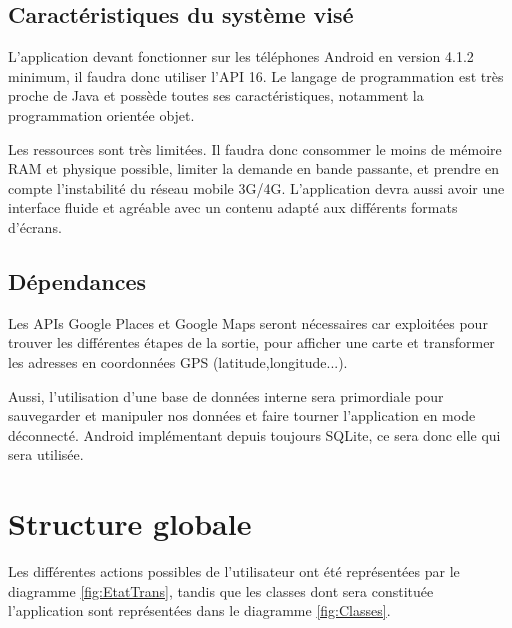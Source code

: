 \documentclass[a4paper, 12pt, notitlepage]{article} %
\begin{document}
\subsection{Caractéristiques du système visé}
L'application devant fonctionner sur les téléphones Android en version 4.1.2 minimum, il faudra donc utiliser l'API 16.
Le langage de programmation est très proche de Java et possède toutes ses caractéristiques, notamment la programmation orientée objet.

Les ressources sont très limitées. Il faudra donc consommer le moins de mémoire RAM et physique possible, limiter la demande en bande passante, et prendre en compte l'instabilité du réseau mobile 3G/4G.
L'application devra aussi avoir une interface fluide et agréable avec un contenu adapté aux différents formats d'écrans.

\subsection{Dépendances}
Les APIs Google Places et Google Maps seront nécessaires car exploitées pour trouver les différentes étapes de la sortie, pour afficher une carte et transformer les adresses en coordonnées GPS (latitude,longitude...).

Aussi, l'utilisation d'une base de données interne sera primordiale pour sauvegarder et manipuler nos données et faire tourner l'application en mode déconnecté. Android implémentant depuis toujours SQLite, ce sera donc elle qui sera utilisée.
\clearpage



\section{Structure globale}
Les différentes actions possibles de l’utilisateur ont été représentées par le diagramme \ref{fig:EtatTrans}, tandis que les classes dont sera constituée l'application sont représentées dans le diagramme \ref{fig:Classes}.
\end{document}
